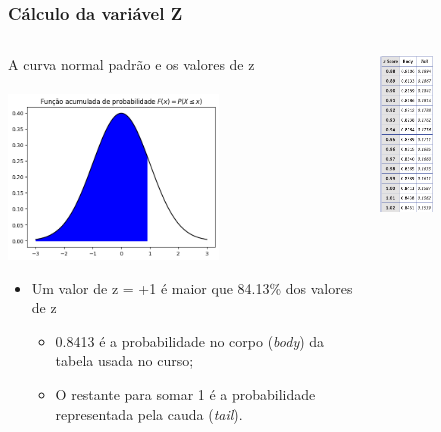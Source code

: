 \documentclass[11pt]{beamer}
\begin{document}
\begin{frame}
\frametitle{Cálculo da variável Z}
\begin{columns}
\begin{column}{0.5\textwidth}
   A curva normal padrão e os valores de z\\~\\
   \includegraphics[width=0.6\textwidth]{figs/pdf_norm_84}
   \begin{itemize}
   \item Um valor de z = +1 é maior que 84.13\% dos valores de z
   \begin{itemize}
   \item 0.8413 é a probabilidade no corpo (\textit{body}) da tabela usada no curso;
   \item O restante para somar 1 é a probabilidade representada pela cauda (\textit{tail}).
   \end{itemize}
   \end{itemize}
\end{column}
\begin{column}{0.5\textwidth}  %
    \begin{center}
     \includegraphics[width=0.4\textwidth]{figs/ztab_crop}

\end{center}
\end{column}
\end{columns}
\end{frame}
\end{document}
